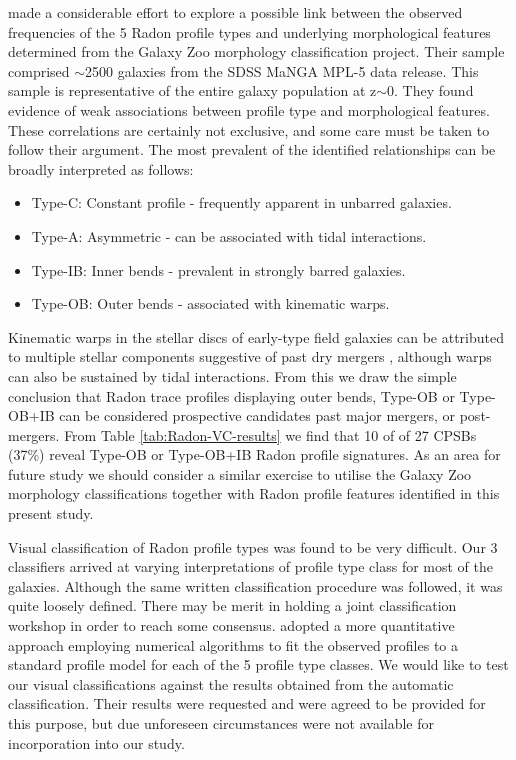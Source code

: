 \cite{2018MNRAS.480.2217S} made a considerable effort to explore a possible link between the observed frequencies of the 5 Radon profile types and underlying morphological features determined from the Galaxy Zoo morphology classification project. Their sample comprised $\sim$2500 galaxies from the SDSS MaNGA MPL-5 data release. This sample is representative of the entire galaxy population at z$\sim$0. They found evidence of weak associations between profile type and morphological features. These correlations are certainly not exclusive, and some care must be taken to follow their argument. The most prevalent of the identified relationships can be broadly interpreted as follows:
\begin{itemize}
    \item Type-C: Constant profile - frequently apparent in unbarred galaxies.
    \item Type-A: Asymmetric - can be associated with tidal interactions.
    \item Type-IB: Inner bends - prevalent in strongly barred galaxies.
    \item Type-OB: Outer bends - associated with kinematic warps.
\end{itemize}
Kinematic warps in the stellar discs of early-type field galaxies can be attributed to multiple stellar components suggestive of past dry mergers \citep{2005AJ....130.2647V}, although warps can also be sustained by tidal interactions.
From this we draw the simple conclusion that Radon trace profiles displaying outer bends, Type-OB or Type-OB+IB can be considered prospective candidates past major mergers, or post-mergers. From Table \ref{tab:Radon-VC-results} we find that 10 of of 27 CPSBs (37\%) reveal Type-OB or Type-OB+IB Radon profile signatures. 
As an area for future study we should consider a similar exercise to utilise the Galaxy Zoo morphology classifications together with Radon profile features identified in this present study. 

Visual classification of Radon profile types was found to be very difficult. Our 3 classifiers arrived at varying interpretations of profile type class for most of the galaxies. Although the same written classification procedure was followed, it was quite loosely defined. There may be merit in holding a joint classification workshop in order to reach some consensus. \cite{2018MNRAS.480.2217S} adopted a more quantitative approach employing numerical algorithms to fit the observed profiles to a standard profile model for each of the 5 profile type classes. We would like to test our visual classifications against the results obtained from the automatic classification. Their results were requested and were agreed to be provided for this purpose, but due unforeseen circumstances were not available for incorporation into our study.

